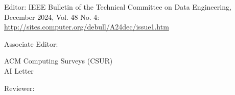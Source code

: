 \documentclass[10pt]{article}
\newenvironment{myindentpar}[1]%
{\begin{list}{}%
         {\setlength{\leftmargin}{#1}}%
         \item[]%
}
{\end{list}}
\newcounter{list}
\begin{document}
\begin{myindentpar}{0.75cm}
{%


}


\hspace{-0.75cm}{\bf Journal Service}

Editor: {\small IEEE Bulletin of the Technical Committee on Data Engineering, December 2024, Vol. 48 No. 4: \url{http://sites.computer.org/debull/A24dec/issue1.htm}}

Associate Editor:

{\small

ACM Computing Surveys (CSUR) \\
AI Letter

}

Reviewer:

{\small

}
\end{myindentpar}
\end{document}
